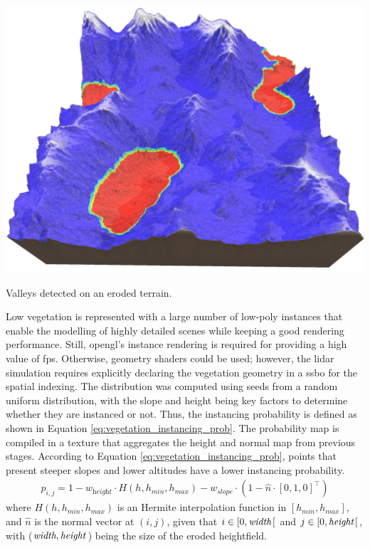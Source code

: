 \begin{marginfigure}[1.0cm]
    \centering
    \includegraphics[width=\linewidth]{figs/lidar_simulation/valley_finds.png}
	\caption{Valleys detected on an eroded terrain. }
	\label{fig:terrain_valleys}
\end{marginfigure}
Low vegetation is represented with a large number of low-poly instances that enable the modelling of highly detailed scenes while keeping a good rendering performance. Still, \acrshort{opengl}'s instance rendering is required for providing a high value of \acrshort{fps}. Otherwise, geometry shaders could be used; however, the \acrshort{lidar} simulation requires explicitly declaring the vegetation geometry in a \acrshort{ssbo} for the spatial indexing. The distribution was computed using seeds from a random uniform distribution, with the slope and height being key factors to determine whether they are instanced or not. Thus, the instancing probability is defined as shown in Equation \ref{eq:vegetation_instancing_prob}. The probability map is compiled in a texture that aggregates the height and normal map from previous stages. According to Equation \ref{eq:vegetation_instancing_prob}, points that present steeper slopes and lower altitudes have a lower instancing probability.
\begin{gather}
    \label{eq:vegetation_instancing_prob}
    p_{i, j} = 1 - w_{\textit{height}} \cdot H(h, h_{\textit{min}}, h_{\textit{max}}) - w_{\textit{slope}} \cdot (1 - \hat{n} \cdot \left[0, 1, 0\right]^\intercal)
\end{gather}
where $H(h, h_{\textit{min}}, h_{\textit{max}})$ is an Hermite interpolation function in $[h_{\textit{min}}, h_{\textit{max}}]$, and $\hat{n}$ is the normal vector at $(i, j)$, given that $i \in [0, \textit{width}\hspace{.5mm}[$ and $j \in [0, \textit{height}\hspace{.5mm}[$, with ($\textit{width}, \textit{height}\hspace{.5mm}$) being the size of the eroded heightfield.

